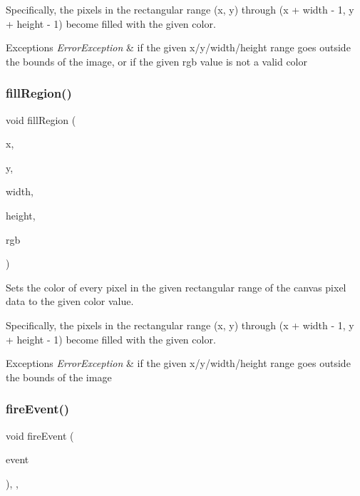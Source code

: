 Specifically, the pixels in the rectangular range (x, y) through (x + width -\/ 1, y + height -\/ 1) become filled with the given color. 
\begin{DoxyExceptions}{Exceptions}
{\em Error\+Exception} & if the given x/y/width/height range goes outside the bounds of the image, or if the given rgb value is not a valid color \\
\hline
\end{DoxyExceptions}
\mbox{\label{classsgl_1_1GCanvas_a762c611a5065687112018e7a0ab10c84}} 
\subsubsection{\texorpdfstring{fill\+Region()}{fillRegion()}\hspace{0.1cm}{\footnotesize\ttfamily [2/2]}}
{\footnotesize\ttfamily void fill\+Region (\begin{DoxyParamCaption}\item[{double}]{x,  }\item[{double}]{y,  }\item[{double}]{width,  }\item[{double}]{height,  }\item[{const std\+::string \&}]{rgb }\end{DoxyParamCaption})\hspace{0.3cm}{\ttfamily [virtual]}}



Sets the color of every pixel in the given rectangular range of the canvas pixel data to the given color value. 

Specifically, the pixels in the rectangular range (x, y) through (x + width -\/ 1, y + height -\/ 1) become filled with the given color. 
\begin{DoxyExceptions}{Exceptions}
{\em Error\+Exception} & if the given x/y/width/height range goes outside the bounds of the image \\
\hline
\end{DoxyExceptions}
\mbox{\label{classsgl_1_1GObservable_a63e5e5a6227c59c928493b11aceb0f67}} 
\subsubsection{\texorpdfstring{fire\+Event()}{fireEvent()}}
{\footnotesize\ttfamily void fire\+Event (\begin{DoxyParamCaption}\item[{\mbox{\hyperlink{classsgl_1_1GEvent}{G\+Event}} \&}]{event }\end{DoxyParamCaption})\hspace{0.3cm}{\ttfamily [protected]}, {\ttfamily [virtual]}, {\ttfamily [inherited]}}



